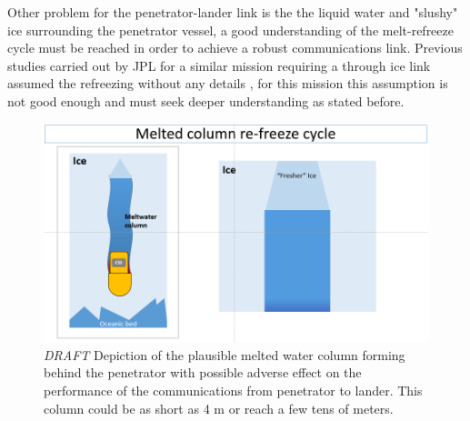 Other problem for the penetrator-lander link is the the liquid water and "slushy" ice surrounding the penetrator vessel, a good understanding of the melt-refreeze cycle must be reached in order to achieve a robust communications link. Previous studies carried out by JPL for a similar mission requiring a through ice link assumed the refreezing without any details \cite{iceLink-scott}, for this mission this assumption is not good enough and must seek deeper understanding as stated before. 

\begin{figure}[htb]
	\centering
	\includegraphics[width=\textwidth]{figures/comms/meltColCycle_0}
	\caption{ \textit{DRAFT} Depiction of the plausible melted water column forming behind the penetrator with possible adverse effect on the performance of the communications from penetrator to lander. This column could be as short as 4 m or reach a few tens of meters.}
	\label{fig:meltColumn_broad}
\end{figure}

